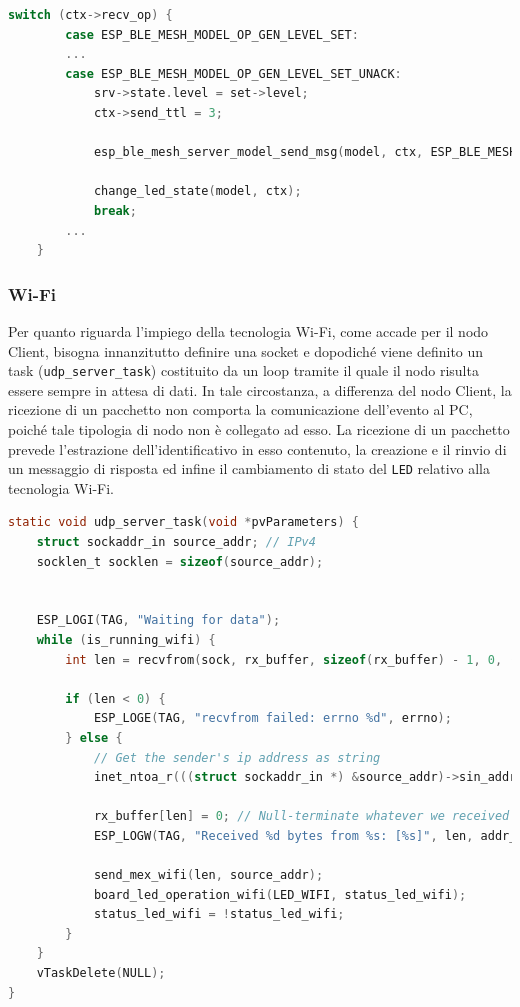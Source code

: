 \begin{lstlisting}[language=C, caption= gestione messaggi di tipo \texttt{SET\_UNACK}]
switch (ctx->recv_op) {
        case ESP_BLE_MESH_MODEL_OP_GEN_LEVEL_SET:
        ...
        case ESP_BLE_MESH_MODEL_OP_GEN_LEVEL_SET_UNACK:
            srv->state.level = set->level;
            ctx->send_ttl = 3;
            
            esp_ble_mesh_server_model_send_msg(model, ctx, ESP_BLE_MESH_MODEL_OP_GEN_LEVEL_STATUS, sizeof(srv->state.level), (uint8_t *) &srv->state.level);

            change_led_state(model, ctx);
            break;
        ...
    }
\end{lstlisting}

\subsubsection{Wi-Fi}
Per quanto riguarda l'impiego della tecnologia Wi-Fi, come accade per il nodo Client, bisogna innanzitutto definire una socket e dopodiché viene definito un task (\texttt{udp\_server\_task}) costituito da un loop tramite il quale il nodo risulta essere sempre in attesa di dati. In tale circostanza, a differenza del nodo Client, la ricezione di un pacchetto non comporta la comunicazione dell'evento al PC, poiché tale tipologia di nodo non è collegato ad esso. La ricezione di un pacchetto prevede l'estrazione dell'identificativo in esso contenuto, la creazione e il rinvio di un messaggio di risposta ed infine il cambiamento di stato del \texttt{LED} relativo alla tecnologia Wi-Fi.

\begin{lstlisting}[language=C, caption= ricezione messaggio Wi-Fi su un nodo Server]
static void udp_server_task(void *pvParameters) {
    struct sockaddr_in source_addr; // IPv4
    socklen_t socklen = sizeof(source_addr);


    ESP_LOGI(TAG, "Waiting for data");
    while (is_running_wifi) {
        int len = recvfrom(sock, rx_buffer, sizeof(rx_buffer) - 1, 0, (struct sockaddr *) &source_addr, &socklen);

        if (len < 0) {
            ESP_LOGE(TAG, "recvfrom failed: errno %d", errno);
        } else {
            // Get the sender's ip address as string
            inet_ntoa_r(((struct sockaddr_in *) &source_addr)->sin_addr.s_addr, addr_str, sizeof(addr_str) - 1);

            rx_buffer[len] = 0; // Null-terminate whatever we received and treat like a string...
            ESP_LOGW(TAG, "Received %d bytes from %s: [%s]", len, addr_str, rx_buffer);

            send_mex_wifi(len, source_addr);
            board_led_operation_wifi(LED_WIFI, status_led_wifi);
            status_led_wifi = !status_led_wifi;
        }
    }
    vTaskDelete(NULL);
}
\end{lstlisting}

